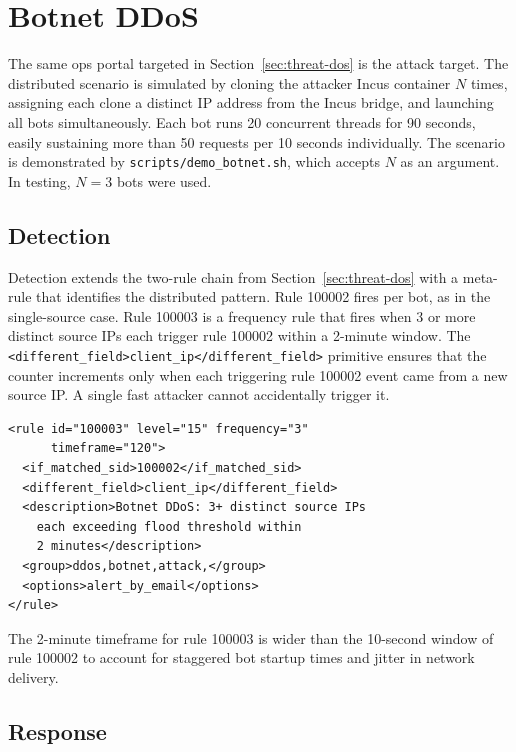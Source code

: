 \section{Botnet DDoS}
\label{sec:botnet}

The same ops portal targeted in
Section~\ref{sec:threat-dos} is the attack target. The distributed scenario is
simulated by cloning the attacker Incus container $N$ times, assigning each
clone a distinct IP address from the Incus bridge, and launching all bots
simultaneously. Each bot runs 20 concurrent threads for 90 seconds, easily
sustaining more than 50 requests per 10 seconds individually. The scenario is
demonstrated by \texttt{scripts/demo\_botnet.sh}, which accepts $N$ as an
argument. In testing, $N=3$ bots were used.

\subsection{Detection}

Detection extends the two-rule chain from Section~\ref{sec:threat-dos} with a
meta-rule that identifies the distributed pattern. Rule 100002 fires per bot,
as in the single-source case. Rule 100003 is a frequency rule that fires when
3 or more distinct source IPs each trigger rule 100002 within a 2-minute window.
The \texttt{<different\_field>client\_ip</different\_field>} primitive ensures
that the counter increments only when each triggering rule 100002 event came
from a new source IP. A single fast attacker cannot accidentally trigger it.

\begin{lstlisting}[style=xmlstyle, caption={Wazuh rule for botnet DDoS detection.}]
<rule id="100003" level="15" frequency="3"
      timeframe="120">
  <if_matched_sid>100002</if_matched_sid>
  <different_field>client_ip</different_field>
  <description>Botnet DDoS: 3+ distinct source IPs
    each exceeding flood threshold within
    2 minutes</description>
  <group>ddos,botnet,attack,</group>
  <options>alert_by_email</options>
</rule>
\end{lstlisting}

The 2-minute timeframe for rule 100003 is wider than the 10-second window of
rule 100002 to account for staggered bot startup times and jitter in network
delivery.

\subsection{Response}

